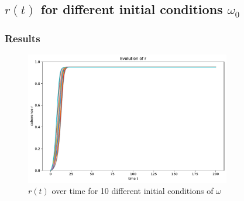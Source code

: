 \documentclass[11pt,a4paper]{article}
\begin{document}
\subsection{$r(t)$ for different initial conditions $\omega_0$}






\subsubsection{Results}

\begin{figure}[h]
	\centering
	\includegraphics[width=0.8\textwidth]{graphics/5_t-vs-r_fixedThetas_omegaDistr=uniform_N=2000_1611572031.pdf}
	\caption{$r(t)$ over time for 10 different initial conditions of $\omega$}
	\label{5}
\end{figure}
\end{document}
